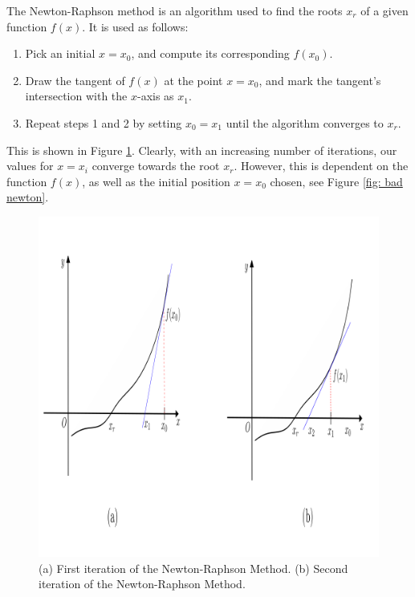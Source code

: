 \begin{flushleft}
The Newton-Raphson method is an algorithm used to find the roots $x_r$ of a given function $f(x)$. It is used as follows:
\begin{enumerate}
    \item Pick an initial $x = x_0$, and compute its corresponding $f(x_0)$.
    \vspace{-3mm}
    \item Draw the tangent of $f(x)$ at the point $x = x_0$, and mark the tangent's intersection with the $x$-axis as $x_1$.
    \vspace{-3mm}
    \item Repeat steps 1 and 2 by setting $x_0 = x_1$ until the algorithm converges to $x_r$.
\end{enumerate}

This is shown in Figure \ref{fig: newton}. Clearly, with an increasing number of iterations, our values for $x = x_i$ converge towards the root $x_r$. However, this is dependent on the function $f(x)$, as well as the initial position $x=x_0$ chosen, see Figure \ref{fig: bad newton}. 
\end{flushleft}

\begin{figure}[htbp]
    \centering
    \includegraphics[width = 1\textwidth]{Chapter 4/9. newton raphson.png}
    \caption{(a) First iteration of the Newton-Raphson Method. (b) Second iteration of the Newton-Raphson Method.}
    \label{fig: newton}
\end{figure}

